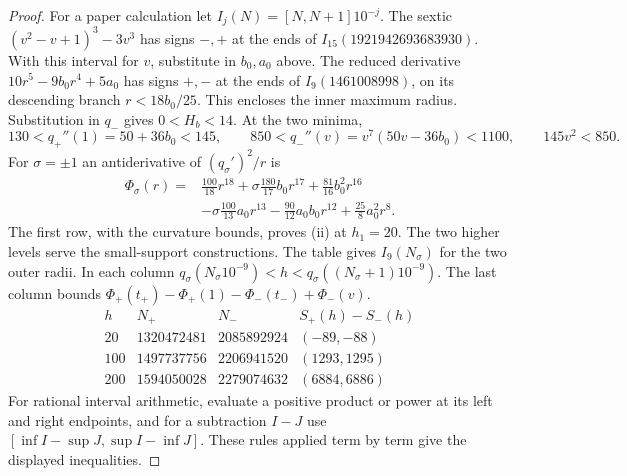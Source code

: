 \begin{proof}
For a paper calculation let $I_j(N)=[N,N+1]10^{-j}$.
The sextic $(v^2-v+1)^3-3v^3$ has signs $-,+$ at the ends of
$I_{15}(1921942693683930)$. With this interval for $v$, substitute in
$b_0,a_0$ above. The reduced derivative $10r^5-9b_0r^4+5a_0$ has signs
$+,-$ at the ends of $I_9(1461008998)$, on its descending branch
$r<18b_0/25$. This encloses the inner maximum radius. Substitution in
$q_-$ gives $0<H_b<14$. At the two minima,
\[
 130<q_+''(1)=50+36b_0<145,\qquad
 850<q_-''(v)=v^7(50v-36b_0)<1100,\qquad 145v^2<850 .
\]
For $\sigma=\pm1$ an antiderivative of $(q_\sigma')^2/r$ is
\[
 \begin{aligned}
 \Phi_\sigma(r)={}&\tfrac{100}{18}r^{18}
 +\sigma\tfrac{180}{17}b_0r^{17}+\tfrac{81}{16}b_0^2r^{16}\\
 &-\sigma\tfrac{100}{13}a_0r^{13}
 -\tfrac{90}{12}a_0b_0r^{12}+\tfrac{25}{8}a_0^2r^8 .
 \end{aligned}
\]
The first row, with the curvature bounds, proves (ii) at $h_1=20$.
The two higher levels serve the small-support constructions.
The table gives $I_9(N_\sigma)$ for the two outer radii. In each
column $q_\sigma(N_\sigma10^{-9})<h<q_\sigma((N_\sigma+1)10^{-9})$.
The last column bounds
$\Phi_+(t_+)-\Phi_+(1)-\Phi_-(t_-)+\Phi_-(v)$.
\[
\begin{array}{r|rr|c}
 h &N_+&N_-&S_+(h)-S_-(h)\\ \hline
 20&1320472481&2085892924&(-89,-88)\\
 100&1497737756&2206941520&(1293,1295)\\
 200&1594050028&2279074632&(6884,6886)
\end{array}
\]
For rational interval arithmetic, evaluate a positive product or power at its
left and right endpoints, and for a subtraction $I-J$ use
$[\inf I-\sup J,\sup I-\inf J]$. These rules applied term by term give
the displayed inequalities.
\end{proof}
